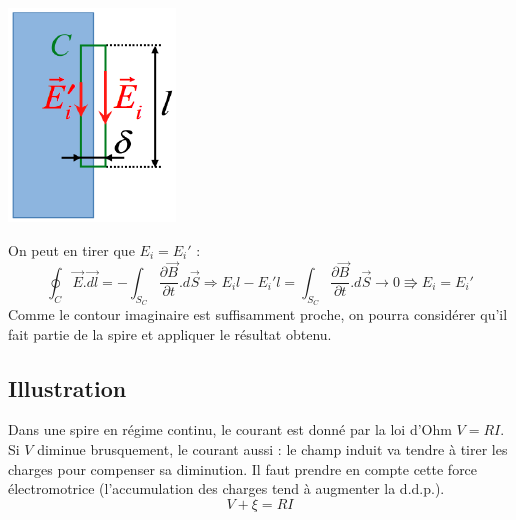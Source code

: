 \documentclass	[11pt, a4paper, openany]{book}
\begin{document}
\begin{center}
\includegraphics[scale=0.47]{em/image21.png}\\
\end{center}
On peut en tirer que $E_i = E_i'$ :
\begin{equation}
\oint_C \vec{E}.\vec{dl} = -\int_{S_C}\frac{\partial\vec{B}}{\partial t}.d\vec{S} \Rightarrow E_il - E_i'l = \int_{S_C} \frac{\partial\vec{B}}{\partial t}.d\vec{S} \rightarrow 0 \Rrightarrow E_i = E_i'
\end{equation}
Comme le contour imaginaire est suffisamment proche, on pourra considérer qu'il fait partie de la spire et appliquer le résultat obtenu.

\subsection{Illustration}
Dans une spire en régime continu, le courant est donné par la loi d'Ohm $ V = RI$. Si $V$ diminue brusquement, le courant aussi : le champ induit va tendre à tirer les charges pour compenser sa diminution. Il faut prendre en compte cette force électromotrice (l'accumulation des charges tend à augmenter la d.d.p.).
\begin{equation}
V + \xi = RI
\end{equation}
\end{document}
